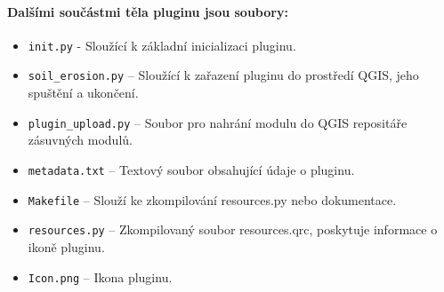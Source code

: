 \paragraph{Dalšími součástmi těla pluginu jsou soubory:}
\begin{itemize}
	\item \texttt{init.py} - Sloužící k základní inicializaci pluginu.
	\item \texttt{soil\_erosion.py} – Sloužící k zařazení pluginu do prostředí QGIS, jeho spuštění a ukončení.
	\item \texttt{plugin\_upload.py} – Soubor pro nahrání modulu do QGIS repositáře zásuvných modulů.
	\item \texttt{metadata.txt} – Textový soubor obsahující údaje o pluginu.
	\item \texttt{Makefile} – Slouží ke zkompilování resources.py nebo dokumentace.
	\item \texttt{resources.py} – Zkompilovaný soubor resources.qrc, poskytuje informace o ikoně pluginu.
	\item \texttt{Icon.png} – Ikona pluginu.
\end{itemize}